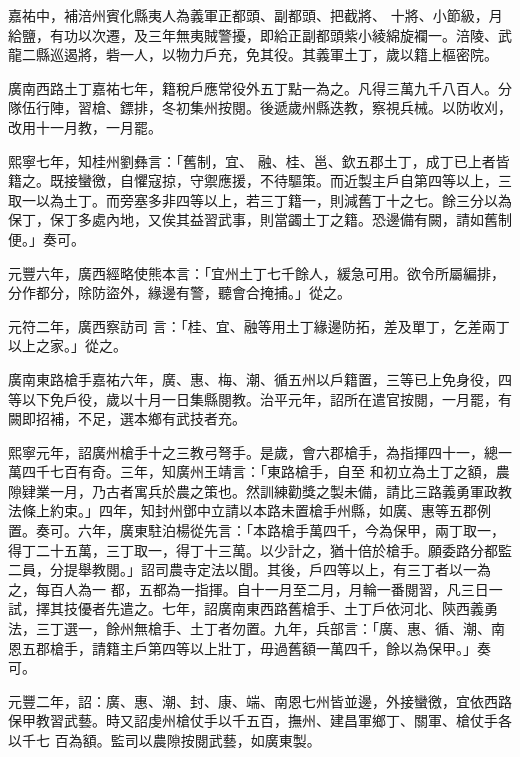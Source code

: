 \begin{pinyinscope}
 嘉祐中，補涪州賓化縣夷人為義軍正都頭、副都頭、把截將、
 十將、小節級，月給鹽，有功以次遷，及三年無夷賊警擾，即給正副都頭紫小綾綿旋襴一。涪陵、武龍二縣巡遏將，砦一人，以物力戶充，免其役。其義軍土丁，歲以籍上樞密院。



 廣南西路土丁嘉祐七年，籍稅戶應常役外五丁點一為之。凡得三萬九千八百人。分隊伍行陣，習槍、鏢排，冬初集州按閱。後遞歲州縣迭教，察視兵械。以防收刈，改用十一月教，一月罷。



 熙寧七年，知桂州劉彝言：「舊制，宜、
 融、桂、邕、欽五郡土丁，成丁已上者皆籍之。既接蠻徼，自懼寇掠，守禦應援，不待驅策。而近製主戶自第四等以上，三取一以為土丁。而旁塞多非四等以上，若三丁籍一，則減舊丁十之七。餘三分以為保丁，保丁多處內地，又俟其益習武事，則當蠲土丁之籍。恐邊備有闕，請如舊制便。」奏可。



 元豐六年，廣西經略使熊本言：「宜州土丁七千餘人，緩急可用。欲令所屬編排，分作都分，除防盜外，緣邊有警，聽會合掩捕。」從之。



 元符二年，廣西察訪司
 言：「桂、宜、融等用土丁緣邊防拓，差及單丁，乞差兩丁以上之家。」從之。



 廣南東路槍手嘉祐六年，廣、惠、梅、潮、循五州以戶籍置，三等已上免身役，四等以下免戶役，歲以十月一日集縣閱教。治平元年，詔所在遣官按閱，一月罷，有闕即招補，不足，選本鄉有武技者充。



 熙寧元年，詔廣州槍手十之三教弓弩手。是歲，會六郡槍手，為指揮四十一，總一萬四千七百有奇。三年，知廣州王靖言：「東路槍手，自至
 和初立為土丁之額，農隙肄業一月，乃古者寓兵於農之策也。然訓練勸獎之製未備，請比三路義勇軍政教法條上約束。」四年，知封州鄧中立請以本路未置槍手州縣，如廣、惠等五郡例置。奏可。六年，廣東駐泊楊從先言：「本路槍手萬四千，今為保甲，兩丁取一，得丁二十五萬，三丁取一，得丁十三萬。以少計之，猶十倍於槍手。願委路分都監二員，分提舉教閱。」詔司農寺定法以聞。其後，戶四等以上，有三丁者以一為之，每百人為一
 都，五都為一指揮。自十一月至二月，月輪一番閱習，凡三日一試，擇其技優者先遣之。七年，詔廣南東西路舊槍手、土丁戶依河北、陝西義勇法，三丁選一，餘州無槍手、土丁者勿置。九年，兵部言：「廣、惠、循、潮、南恩五郡槍手，請籍主戶第四等以上壯丁，毋過舊額一萬四千，餘以為保甲。」奏可。



 元豐二年，詔：廣、惠、潮、封、康、端、南恩七州皆並邊，外接蠻徼，宜依西路保甲教習武藝。時又詔虔州槍仗手以千五百，撫州、建昌軍鄉丁、關軍、槍仗手各以千七
 百為額。監司以農隙按閱武藝，如廣東製。




\end{pinyinscope}
